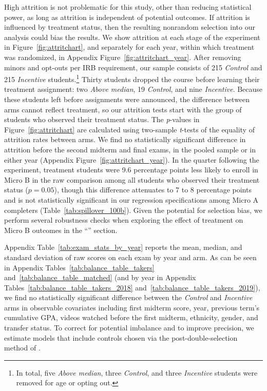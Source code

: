 High attrition is not problematic for this study, other than reducing statistical power, as long as attrition is independent of potential outcomes.
If attrition is influenced by treatment status, then the resulting nonrandom selection into our analysis could bias the results.
We show attrition at each stage of the experiment in Figure~\ref{fig:attritchart}, and separately for each year, within which treatment was randomized, in Appendix Figure~\ref{fig:attritchart_year}.
After removing minors and opt-outs per IRB requirement, our sample consists of 215 \textit{Control} and 215 \textit{Incentive} students.\footnote{In total, five \textit{Above median}, three \textit{Control}, and three \textit{Incentive} students were removed for age or opting out.}
Thirty students dropped the course before learning their treatment assignment: two \textit{Above median}, 19 \textit{Control}, and nine \textit{Incentive}.
Because these students left before assignments were announced, the difference between arms cannot reflect treatment, so our attrition tests start with the group of students who observed their treatment status.
The \textit{p}-values in Figure~\ref{fig:attritchart} are calculated using two-sample \textit{t}-tests of the equality of attrition rates between arms.
We find no statistically significant difference in attrition before the second midterm and final exams, in the pooled sample or in either year (Appendix Figure~\ref{fig:attritchart_year}).
In the quarter following the experiment, treatment students were 9.6 percentage points less likely to enroll in Micro B in the raw comparison among all students who observed their treatment status ($p=0.05$), though this difference attenuates to 7 to 8 percentage points and is not statistically significant in our regression specifications among Micro A completers (Table~\ref{tab:spillover_100b}).
Given the potential for selection bias, we perform several robustness checks when exploring the effect of treatment on Micro B outcomes in the ``'' section.


Appendix Table~\ref{tab:exam_stats_by_year} reports the mean, median, and standard deviation of raw scores on each exam by year and arm.
As can be seen in Appendix Tables~\ref{tab:balance_table_takers} and~\ref{tab:balance_table_matched} (and by year in Appendix Tables~\ref{tab:balance_table_takers_2018} and~\ref{tab:balance_table_takers_2019}), we find no statistically significant difference between the \textit{Control} and \textit{Incentive} arms in observable covariates including first midterm score, year, previous term's cumulative GPA, videos watched before the first midterm, ethnicity, gender, and transfer status.
To correct for potential imbalance and to improve precision, we estimate models that include controls chosen via the post-double-selection method of \textcite{bch2014a}.

